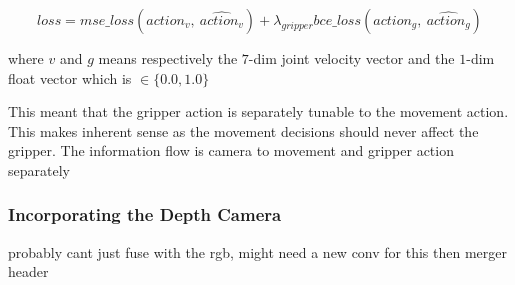 \[
  loss = mse\_loss \left(action_{v}, ~\hat{action_v}\right) 
  + 
  \lambda_{gripper} bce\_loss\left( action_{g}, ~\hat{action_g}\right)
\]

where $v$ and $g$ means respectively the $7$-dim joint velocity vector and the $1$-dim float vector which is \( \in \{ 0.0, 1.0 \}\)

This meant that the gripper action is separately tunable to the movement action. This makes inherent sense as the movement decisions should never affect the gripper. The information flow is camera to movement and gripper action separately  




\subsubsection{Incorporating the Depth Camera}
probably cant just fuse with the rgb, might need a new conv for this then merger header


